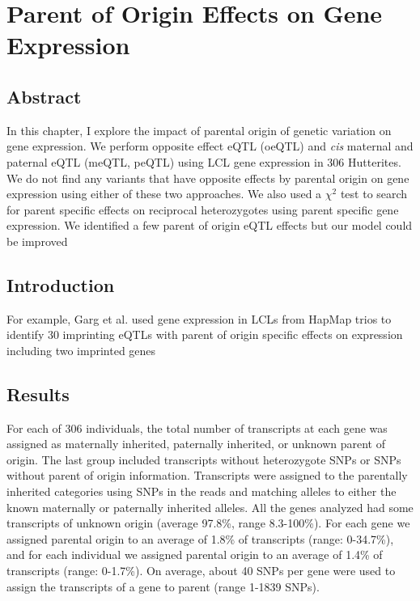 
\chapter{Parent of Origin Effects on Gene Expression }\label{ch:poeqtl}
\section[Abstract]{Abstract}

In this chapter, I explore the impact of parental origin of genetic variation on gene expression. We perform opposite effect eQTL (oeQTL) and \emph{cis} maternal and paternal eQTL (meQTL, peQTL) using LCL gene expression in 306 Hutterites. We do not find any variants that have opposite effects by parental origin on gene expression using either of these two approaches. We also used a $\chi^2$ test to search for parent specific effects on reciprocal heterozygotes using parent specific gene expression. We identified a few parent of origin eQTL effects but our model could be improved 


\section{Introduction}\label{ch04-introduction}

For example, Garg et al. used gene expression in LCLs from HapMap trios to identify 30 imprinting eQTLs with parent of origin specific effects on expression including two imprinted genes\cite{Garg2012a}

\section{Results}\label{ch04-results}

For each of 306 individuals, the total number of transcripts at each gene was assigned as maternally inherited, paternally inherited, or unknown parent of origin. The last group included transcripts without heterozygote SNPs or SNPs without parent of origin information. Transcripts were assigned to the parentally inherited categories using SNPs in the reads and matching alleles to either the known maternally or paternally inherited alleles. All the genes analyzed had some transcripts of unknown origin (average 97.8\%, range 8.3-100\%). For each gene we assigned parental origin to an average of 1.8\% of transcripts (range: 0-34.7\%), and for each individual we assigned parental origin to an average of 1.4\% of transcripts (range: 0-1.7\%). On average, about 40 SNPs per gene were used to assign the transcripts of a gene to parent (range 1-1839 SNPs). 


